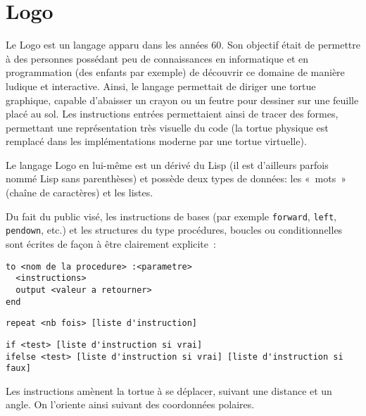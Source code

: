 \section{Logo}

Le Logo est un langage apparu dans les années 60. Son objectif était de permettre à des personnes possédant peu de connaissances en informatique et en programmation (des enfants par exemple) de découvrir ce domaine de manière ludique et interactive. Ainsi, le langage permettait de diriger une tortue graphique, capable d'abaisser un crayon ou un feutre pour dessiner sur une feuille placé au sol. Les instructions entrées permettaient ainsi de tracer des formes, permettant une représentation très visuelle du code (la tortue physique est remplacé dans les implémentations moderne par une tortue virtuelle).

Le langage Logo en lui-même est un dérivé du Lisp (il est d'ailleurs parfois nommé Lisp sans parenthèses) et possède deux types de données: les «~mots~» (chaîne de caractères) et les listes.

Du fait du public visé, les instructions de bases (par exemple \verb|forward|, \verb|left|, \verb|pendown|, etc.) et les structures du type procédures, boucles ou conditionnelles sont écrites de façon à être clairement explicite~:

\begin{lstlisting}
to <nom de la procedure> :<parametre>
  <instructions>
  output <valeur a retourner>
end
\end{lstlisting}

\begin{lstlisting}
repeat <nb fois> [liste d'instruction]
\end{lstlisting}

\begin{lstlisting}
if <test> [liste d'instruction si vrai]
ifelse <test> [liste d'instruction si vrai] [liste d'instruction si faux]
\end{lstlisting}

Les instructions amènent la tortue à se déplacer, suivant une distance et un angle. On l'oriente ainsi suivant des coordonnées polaires.
